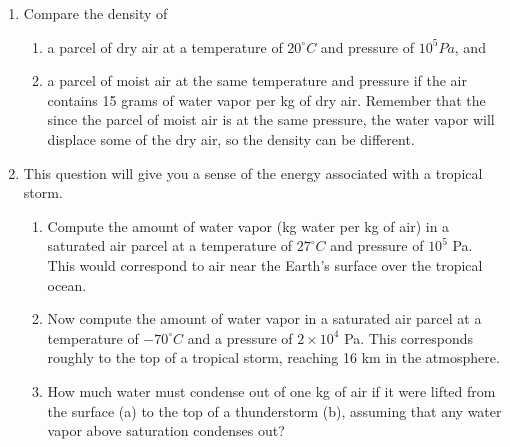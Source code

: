 \documentclass[letterpaper, 11pt]{article}
\newcommand{\1}{\mathds{1}}	%
\theoremstyle{definition}
\begin{document}
\begin{enumerate}[leftmargin=*, label=\arabic*.]
\begin{enumerate}[label=(\alph*)]
    \item Finally, we can use the more accurate approximation in (b), but centered around the boiling point at sea level:
    \[
      e_s = 1000e^{\frac{L}{R_v}(1/373-1/T)},
    \]
    and as in (c), using the value of $L$ at the boiling point, $2.26 \cdot 10^6$ J/kg.

    \item Finally, plot all of these functions of $e_s(T)$ from -20 to $120^\circ$ C (or equivalently, 253-393K). This will give you a visualization of how they differ, and how the simpler approximations become less accurate more quickly as you depart the point where you linearize/approximate the CC relation.
  \end{enumerate}

  \item Compare the density of
  \begin{enumerate}[label=(\alph*)]
    \item a parcel of dry air at a temperature of $20^\circ C$ and pressure of $10^5 Pa$, and
    
    \item a parcel of moist air at the same temperature and pressure if the air contains 15 grams of water vapor per kg of dry air. Remember that the since the parcel of moist air is at the same pressure, the water vapor will displace some of the dry air, so the density can be different.
  \end{enumerate}

  \item This question will give you a sense of the energy associated with a tropical storm.
  \begin{enumerate}[label=(\alph*)]
    \item Compute the amount of water vapor (kg water per kg of air) in a saturated air parcel at a temperature of $27^\circ C$ and pressure of $10^5$ Pa. This would correspond to air near the Earth's surface over the tropical ocean.
    
    \item Now compute the amount of water vapor in a saturated air parcel at a temperature of $-70^\circ C$ and a pressure of $2 \times 10^4$ Pa. This corresponds roughly to the top of a tropical storm, reaching 16 km in the atmosphere.
    
    \item How much water must condense out of one kg of air if it were lifted from the surface (a) to the top of a thunderstorm (b), assuming that any water vapor above saturation condenses out?
    

\end{enumerate}
\end{enumerate}
\end{document}
